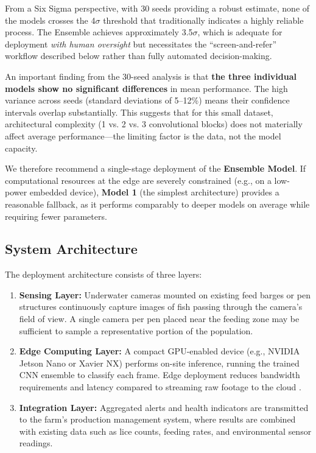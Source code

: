 \documentclass[12pt,a4paper]{article}
\begin{document}
From a Six Sigma perspective, with 30 seeds providing a robust estimate, none of the models crosses the 4$\sigma$ threshold that traditionally indicates a highly reliable process. The Ensemble achieves approximately 3.5$\sigma$, which is adequate for deployment \emph{with human oversight} but necessitates the ``screen-and-refer'' workflow described below rather than fully automated decision-making.
    
An important finding from the 30-seed analysis is that \textbf{the three individual models show no significant differences} in mean performance. The high variance across seeds (standard deviations of 5--12\%) means their confidence intervals overlap substantially. This suggests that for this small dataset, architectural complexity (1 vs. 2 vs. 3 convolutional blocks) does not materially affect average performance---the limiting factor is the data, not the model capacity.

We therefore recommend a single-stage deployment of the \textbf{Ensemble Model}. If computational resources at the edge are severely constrained (e.g., on a low-power embedded device), \textbf{Model 1} (the simplest architecture) provides a reasonable fallback, as it performs comparably to deeper models on average while requiring fewer parameters.

\subsection{System Architecture}
The deployment architecture consists of three layers:
\begin{enumerate}
    \item \textbf{Sensing Layer:} Underwater cameras mounted on existing feed barges or pen structures continuously capture images of fish passing through the camera's field of view. A single camera per pen placed near the feeding zone may be sufficient to sample a representative portion of the population.
    \item \textbf{Edge Computing Layer:} A compact GPU-enabled device (e.g., NVIDIA Jetson Nano or Xavier NX) performs on-site inference, running the trained CNN ensemble to classify each frame. Edge deployment reduces bandwidth requirements and latency compared to streaming raw footage to the cloud \citep{BIAZI2023102360}.
    \item \textbf{Integration Layer:} Aggregated alerts and health indicators are transmitted to the farm's production management system, where results are combined with existing data such as lice counts, feeding rates, and environmental sensor readings.
\end{enumerate}
\end{document}
